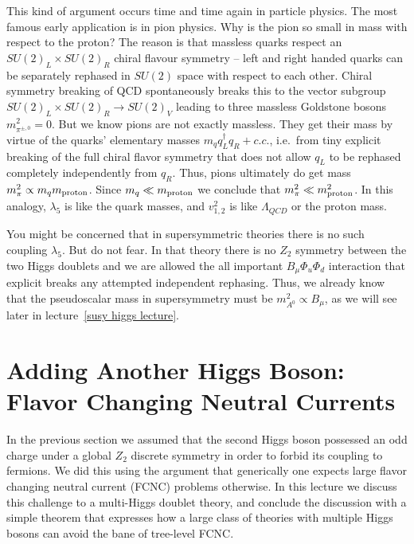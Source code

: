 \documentclass[12pt]{article}
\def\xsection#1{\section{#1}}
\begin{document}
This kind of argument occurs time and time again in particle physics. The most famous early application is in pion physics. Why is the pion so small in mass with respect to the proton? The reason is that massless quarks respect an $SU(2)_L\times SU(2)_R$ chiral flavour symmetry -- left and right handed quarks can be separately rephased in $SU(2)$ space with respect to each other. Chiral symmetry breaking of QCD spontaneously breaks this to the vector subgroup $SU(2)_L\times SU(2)_R\to SU(2)_V$ leading to three massless Goldstone bosons $m^2_{\pi^{\pm,0}}=0$.  But we know pions are not exactly massless. They get their mass by virtue of the quarks' elementary masses $m_q q^\dagger_Lq_R+c.c.$, i.e.\ from tiny explicit breaking of the full chiral flavor symmetry that does not allow $q_L$ to be rephased completely independently from $q_R$. Thus, pions ultimately do get mass $m_\pi^2\propto m_q m_{\rm proton}$. Since $m_q\ll m_{\rm proton}$ we conclude that $m^2_{\pi}\ll m_{\rm proton}^2$. In this analogy, $\lambda_5$ is like the quark masses, and $v_{1,2}^2$ is like $\Lambda_{QCD}$ or the proton mass.


You might be concerned that in supersymmetric theories there is no such coupling $\lambda_5$. But do not fear. In that theory there is no $Z_2$ symmetry between the two Higgs doublets and we are allowed the all important $B_\mu \Phi_u\Phi_d$ interaction that explicit breaks any attempted independent rephasing. Thus, we already know that the pseudoscalar mass in supersymmetry must be $m^2_{A^0}\propto B_\mu$, as we will see later in lecture~\ref{susy higgs lecture}.

\xsection{Adding Another Higgs Boson: Flavor Changing Neutral Currents\label{sec:FCNC}}

In the previous section we assumed that the second Higgs boson possessed an odd charge under a global $Z_2$ discrete symmetry in order to forbid its coupling to fermions. We did this using the argument that generically one expects large flavor changing neutral current (FCNC) problems otherwise. In this lecture we discuss this challenge to a multi-Higgs doublet theory, and conclude the discussion with a simple theorem that expresses how a large class of theories with multiple Higgs bosons can avoid the bane of tree-level FCNC.
\end{document}
